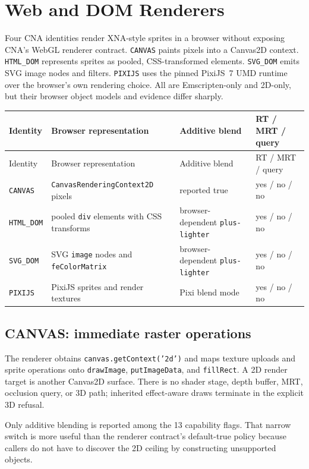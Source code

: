 \chapter{Web and DOM Renderers}
\label{ch:web-dom-renderers}
\label{ch:canvas-ascii-backends}

Four CNA identities render XNA-style sprites in a browser without exposing CNA's WebGL renderer
contract. \texttt{CANVAS}
paints pixels into a Canvas2D context.  \texttt{HTML\_DOM} represents sprites as pooled,
CSS-transformed elements. \texttt{SVG\_DOM} emits SVG image nodes and filters. \texttt{PIXIJS}
uses the pinned PixiJS~7 UMD runtime over the browser's own rendering choice. All are
Emscripten-only and 2D-only, but their browser object models and evidence differ sharply.

\begin{longtable}{p{}p{}p{}p{}}
\toprule
Identity & Browser representation & Additive blend & RT / MRT / query \\
\midrule
\endfirsthead
\toprule
Identity & Browser representation & Additive blend & RT / MRT / query \\
\midrule
\endhead
\texttt{CANVAS} & \texttt{CanvasRenderingContext2D} pixels & reported true & yes / no / no \\
\texttt{HTML\_DOM} & pooled \texttt{div} elements with CSS transforms & browser-dependent \texttt{plus-lighter} & yes / no / no \\
\texttt{SVG\_DOM} & SVG \texttt{image} nodes and \texttt{feColorMatrix} & browser-dependent \texttt{plus-lighter} & yes / no / no \\
\texttt{PIXIJS} & PixiJS sprites and render textures & Pixi blend mode & yes / no / no \\
\bottomrule
\end{longtable}

\section{CANVAS: immediate raster operations}

The renderer obtains \texttt{canvas.getContext('2d')} and maps texture uploads and sprite
operations onto \texttt{drawImage}, \texttt{putImageData}, and \texttt{fillRect}.  A 2D render
target is another Canvas2D surface.  There is no shader stage, depth buffer, MRT, occlusion
query, or 3D path; inherited effect-aware draws terminate in the explicit 3D refusal.

Only additive blending is reported among the 13 capability flags.  That narrow switch is more
useful than the renderer contract's default-true policy because callers do not have to discover
the 2D ceiling by constructing unsupported objects.

